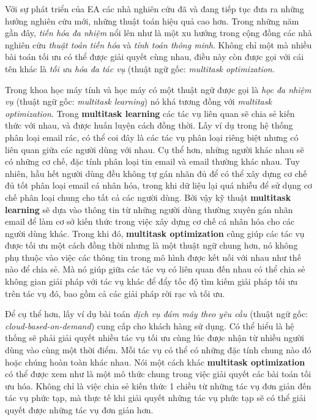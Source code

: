 Với sự phát triển của EA các nhà nghiên cứu đã và đang tiếp tục đưa ra những hướng nghiên cứu mới, những thuật toán hiệu quả cao hơn. Trong những năm gần đây, \emph{tiến hóa đa nhiệm} nổi lên như là một xu hướng trong cộng đồng các nhà nghiên cứu \emph{thuật toán tiến hóa} và \emph{tính toán thông minh}. Không chỉ một mà nhiều bài toán tối ưu có thể được giải quyết cùng nhau, điều này còn được gọi với cái tên khác là \emph{tối ưu hóa đa tác vụ} (thuật ngữ gốc: \emph{multitask  optimization}.

Trong khoa học máy tính và học máy có một thuật ngữ được gọi là \emph{học đa nhiệm vụ } (thuật ngữ gốc: \emph{multitask learning}) nó khá tương đồng với \emph{multitask  optimization}. Trong \textbf{multitask learning} các tác vụ liên quan sẽ chia sẻ kiến thức với nhau, và được huấn luyện cách đồng thời. Lấy ví dụ trong hệ thống phân loại email rác, có thể coi đây là các tác vụ phân loại riêng biệt nhưng có liên quan giữa các người dùng với nhau. Cụ thể hơn, những người khác nhau sẽ có những cơ chế, đặc tính phân loại tin email và email thường khác nhau. Tuy nhiên, hầu hết người dùng đều không tự gán nhãn đủ để có thể xây dựng cơ chế đủ tốt phân loại email cá nhân hóa, trong khi dữ liệu lại quá nhiễu để sử dụng cơ chế phân loại chung cho tất cả các người dùng. Bởi vậy kỹ thuật \textbf{multitask learning} sẽ dựa vào thông tin từ những người dùng thường xuyên gán nhãn email để làm cơ sở kiến thức trong việc xây dựng cơ chế cá nhân hóa cho các người dùng khác. Trong khi đó, \textbf{multitask  optimization} cũng giúp các tác vụ được tối ưu một cách đồng thời nhưng là một thuật ngữ chung hơn, nó không phụ thuộc vào việc các thông tin trong mô hình được kết nối với nhau như thế nào để chia sẻ. Mà nó giúp giữa các tác vụ có liên quan đến nhau có thể chia sẻ không gian giải pháp với tác vụ khác để đẩy tốc độ tìm kiếm giải pháp tối ưu trên tác vụ đó, bao gồm cả các giải pháp rời rạc và tối ưu. 

Để cụ thể hơn, lấy ví dụ bài toán \emph{dịch vụ đám mây theo yêu cầu} (thuật ngữ gốc: \emph{cloud-based-on-demand}) cung cấp cho khách hàng sử dụng. Có thể hiểu là hệ thống sẽ phải giải quyết nhiều tác vụ tối ưu cùng lúc được nhận từ nhiều người dùng vào cùng một thời điểm. Mỗi tác vụ có thể có những đặc tính chung nào đó hoặc chúng hoàn toàn khác nhau. Nói một cách khác \textbf{multitask optimization} có thể được xem như là một mô thức chung trong việc giải quyết các bài toán tối ưu hóa. Không chỉ là việc chia sẻ kiến thức 1 chiều từ những tác vụ đơn giản đến tác vụ phức tạp, mà thực tế khi giải quyết những tác vụ phức tạp sẽ có thể giải quyết được những tác vụ đơn giản hơn. 

